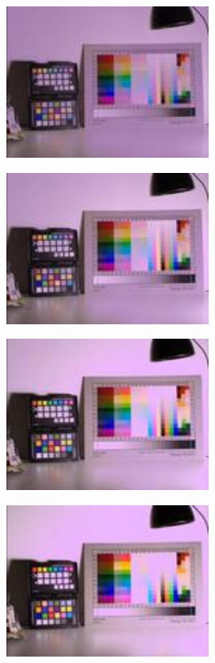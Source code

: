 \begin{center}
\includegraphics[height=5cm]{images/100ms-10ms-32-tiny}
\end{center}

\begin{center}
\includegraphics[height=5cm]{images/100ms-20ms-32-tiny}
\end{center}

\begin{center}
\includegraphics[height=5cm]{images/100ms-35ms-32-tiny}
\end{center}

\begin{center}
\includegraphics[height=5cm]{images/100ms-50ms-32-tiny}
\end{center}

